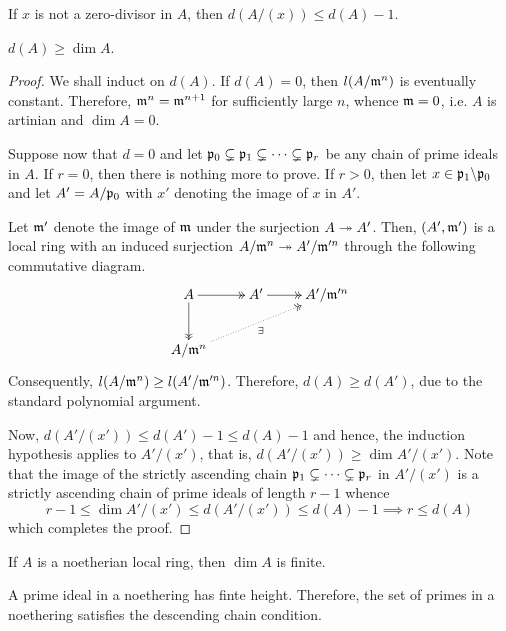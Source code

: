 \begin{corollary}
    If $x$ is not a zero-divisor in $A$, then $d(A/(x))\le d(A) - 1$.
\end{corollary}

\begin{proposition}
    $d(A)\ge\dim A$.
\end{proposition}
\begin{proof}
    We shall induct on $d(A)$. If $d(A) = 0$, then $l(A/\mathfrak m^n)$ is eventually constant. Therefore, $\mathfrak m^n = \mathfrak m^{n + 1}$ for sufficiently large $n$, whence $\mathfrak m = 0$, i.e. $A$ is artinian and $\dim A = 0$.

    Suppose now that $d = 0$ and let $\mathfrak p_0\subsetneq\mathfrak p_1\subsetneq\dots\subsetneq\mathfrak p_r$ be any chain of prime ideals in $A$. If $r = 0$, then there is nothing more to prove. If $r > 0$, then let $x\in\mathfrak p_1\backslash\mathfrak p_0$ and let $A' = A/\mathfrak p_0$ with $x'$ denoting the image of $x$ in $A'$.

    Let $\mathfrak m'$ denote the image of $\mathfrak m$ under the surjection $A\twoheadrightarrow A'$. Then, $(A',\mathfrak m')$ is a local ring with an induced surjection $A/\mathfrak m^n\twoheadrightarrow A'/\mathfrak m'^n$ through the following commutative diagram. 
    \begin{equation*}
        \xymatrix {
            A\ar@{->>}[r]\ar@{->>}[d] & A'\ar@{->>}[r] & A'/\frakm'^n\\
            A/\frakm^n\ar@{.>>}[rru]_{\exists}
        }
    \end{equation*}
    Consequently, $l(A/\mathfrak m^n)\ge l(A'/\mathfrak m'^n)$. Therefore, $d(A)\ge d(A')$, due to the standard polynomial argument. 

    Now, $d(A'/(x'))\le d(A') - 1\le d(A) - 1$ and hence, the induction hypothesis applies to $A'/(x')$, that is, $d(A'/(x'))\ge\dim A'/(x')$. Note that the image of the strictly ascending chain $\mathfrak p_1\subsetneq\dots\subsetneq\mathfrak p_r$ in $A'/(x')$ is a strictly ascending chain of prime ideals of length $r - 1$ whence 
    \begin{equation*}
        r - 1 \le\dim A'/(x')\le d(A'/(x'))\le d(A) - 1\implies r\le d(A)
    \end{equation*}
    which completes the proof.
\end{proof}

\begin{corollary}
    If $A$ is a noetherian local ring, then $\dim A$ is finite.
\end{corollary}

\begin{corollary}
    A prime ideal in a noethering has finte height. Therefore, the set of primes in a noethering satisfies the descending chain condition.
\end{corollary}

